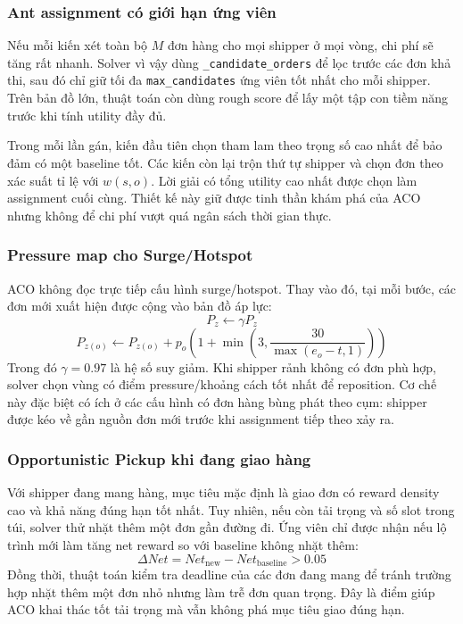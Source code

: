 \documentclass[conference]{IEEEtran}
\begin{document}
\subsubsection{Ant assignment có giới hạn ứng viên}
Nếu mỗi kiến xét toàn bộ $M$ đơn hàng cho mọi shipper ở mọi vòng, chi phí sẽ tăng rất nhanh. Solver vì vậy dùng \texttt{\_candidate\_orders} để lọc trước các đơn khả thi, sau đó chỉ giữ tối đa \texttt{max\_candidates} ứng viên tốt nhất cho mỗi shipper. Trên bản đồ lớn, thuật toán còn dùng rough score để lấy một tập con tiềm năng trước khi tính utility đầy đủ.

Trong mỗi lần gán, kiến đầu tiên chọn tham lam theo trọng số cao nhất để bảo đảm có một baseline tốt. Các kiến còn lại trộn thứ tự shipper và chọn đơn theo xác suất tỉ lệ với $w(s,o)$. Lời giải có tổng utility cao nhất được chọn làm assignment cuối cùng. Thiết kế này giữ được tinh thần khám phá của ACO nhưng không để chi phí vượt quá ngân sách thời gian thực.

\subsubsection{Pressure map cho Surge/Hotspot}
ACO không đọc trực tiếp cấu hình surge/hotspot. Thay vào đó, tại mỗi bước, các đơn mới xuất hiện được cộng vào bản đồ áp lực:
\begin{equation}
P_z \leftarrow \gamma P_z
\end{equation}
\begin{equation}
P_{z(o)} \leftarrow P_{z(o)} +
p_o \left(1 + \min\left(3, \frac{30}{\max(e_o-t,1)}\right)\right)
\end{equation}
Trong đó $\gamma = 0.97$ là hệ số suy giảm. Khi shipper rảnh không có đơn phù hợp, solver chọn vùng có điểm pressure/khoảng cách tốt nhất để reposition. Cơ chế này đặc biệt có ích ở các cấu hình có đơn hàng bùng phát theo cụm: shipper được kéo về gần nguồn đơn mới trước khi assignment tiếp theo xảy ra.

\subsubsection{Opportunistic Pickup khi đang giao hàng}
Với shipper đang mang hàng, mục tiêu mặc định là giao đơn có reward density cao và khả năng đúng hạn tốt nhất. Tuy nhiên, nếu còn tải trọng và số slot trong túi, solver thử nhặt thêm một đơn gần đường đi. Ứng viên chỉ được nhận nếu lộ trình mới làm tăng net reward so với baseline không nhặt thêm:
\begin{equation}
\Delta Net = Net_{\text{new}} - Net_{\text{baseline}} > 0.05
\end{equation}
Đồng thời, thuật toán kiểm tra deadline của các đơn đang mang để tránh trường hợp nhặt thêm một đơn nhỏ nhưng làm trễ đơn quan trọng. Đây là điểm giúp ACO khai thác tốt tải trọng mà vẫn không phá mục tiêu giao đúng hạn.
\end{document}
